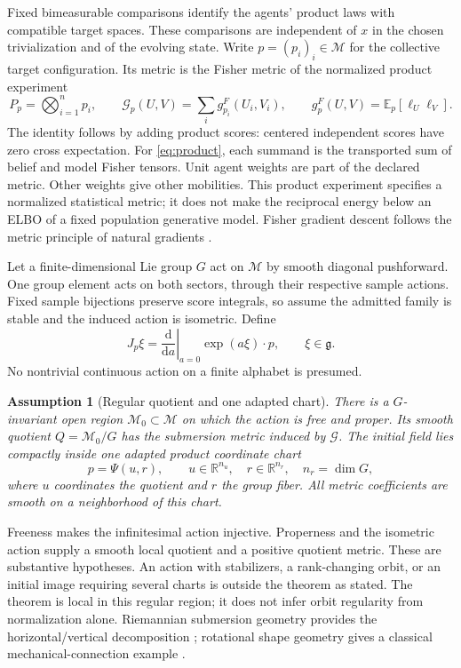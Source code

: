 \documentclass[11pt]{article}
\newtheorem{assumption}[theorem]{Assumption}
\newcommand{\R}{\mathbb R}
\newcommand{\M}{\mathcal M}
\newcommand{\G}{\mathcal G}
\newcommand{\E}{\mathbb E}
\newcommand{\dd}{\mathrm d}
\begin{document}
Fixed bimeasurable comparisons identify the agents' product laws with compatible target spaces. These comparisons are independent of $x$ in the chosen trivialization and of the evolving state. Write $p=(p_i)_i\in\M$ for the collective target configuration. Its metric is the Fisher metric of the normalized product experiment
\begin{equation}
 P_p=\bigotimes_{i=1}^n p_i,\qquad
 \G_p(U,V)=\sum_i g^F_{p_i}(U_i,V_i),\qquad
 g^F_p(U,V)=\E_p[\ell_U\ell_V].
 \label{eq:collective}
\end{equation}
The identity follows by adding product scores: centered independent scores have zero cross expectation. For \eqref{eq:product}, each summand is the transported sum of belief and model Fisher tensors. Unit agent weights are part of the declared metric. Other weights give other mobilities. This product experiment specifies a normalized statistical metric; it does not make the reciprocal energy below an ELBO of a fixed population generative model. Fisher gradient descent follows the metric principle of natural gradients \cite{Amari1998}.

Let a finite-dimensional Lie group $G$ act on $\M$ by smooth diagonal pushforward. One group element acts on both sectors, through their respective sample actions. Fixed sample bijections preserve score integrals, so assume the admitted family is stable and the induced action is isometric. Define
\begin{equation}
 J_p\xi=\left.\frac{\dd}{\dd a}\right|_{a=0}
                \exp(a\xi)\cdot p,\qquad \xi\in\mathfrak g.
 \label{eq:fundamental}
\end{equation}
No nontrivial continuous action on a finite alphabet is presumed.

\begin{assumption}[Regular quotient and one adapted chart]
There is a $G$-invariant open region $\M_0\subset\M$ on which the action is free and proper. Its smooth quotient $Q=\M_0/G$ has the submersion metric induced by $\G$. The initial field lies compactly inside one adapted product coordinate chart
\begin{equation}
 p=\Psi(u,r),\qquad u\in\R^{n_u},\quad r\in\R^{n_r},
 \quad n_r=\dim G,
 \label{eq:chart}
\end{equation}
where $u$ coordinates the quotient and $r$ the group fiber. All metric coefficients are smooth on a neighborhood of this chart.
\label{ass:quotient}
\end{assumption}

Freeness makes the infinitesimal action injective. Properness and the isometric action supply a smooth local quotient and a positive quotient metric. These are substantive hypotheses. An action with stabilizers, a rank-changing orbit, or an initial image requiring several charts is outside the theorem as stated. The theorem is local in this regular region; it does not infer orbit regularity from normalization alone. Riemannian submersion geometry provides the horizontal/vertical decomposition \cite{ONeill1966}; rotational shape geometry gives a classical mechanical-connection example \cite{Littlejohn1997}.
\end{document}
